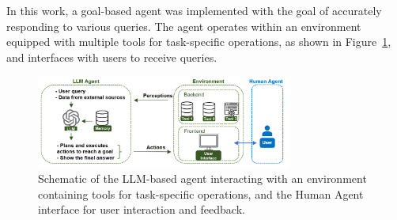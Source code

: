 
            In this work, a goal-based agent \citep{Russell2020} was implemented with the goal of accurately responding to various queries. 
            The agent operates within an environment equipped with multiple tools for task-specific operations, as shown in Figure~\ref{fig:agent_environment}, and interfaces with users to receive queries.
            
            \begin{figure}[h]
                \centering
                \includegraphics[width=0.75\textwidth]{images/agent_environment_4.png}
                \caption{Schematic of the LLM-based agent interacting with an environment containing tools for task-specific operations, and the Human Agent interface for user interaction and feedback.}
                \label{fig:agent_environment}
            \end{figure}           
            
